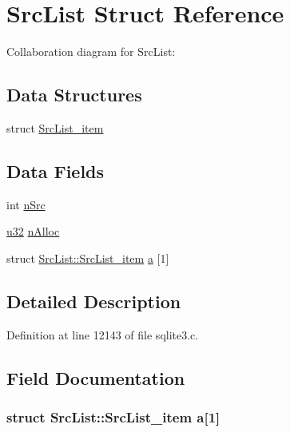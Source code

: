 \hypertarget{struct_src_list}{}\section{Src\+List Struct Reference}
\label{struct_src_list}


Collaboration diagram for Src\+List\+:
\subsection*{Data Structures}
\begin{DoxyCompactItemize}
\item 
struct \hyperlink{struct_src_list_1_1_src_list__item}{Src\+List\+\_\+item}
\end{DoxyCompactItemize}
\subsection*{Data Fields}
\begin{DoxyCompactItemize}
\item 
int \hyperlink{struct_src_list_a2cf806e5639f0b29b62fb34e3e822248}{n\+Src}
\item 
\hyperlink{sqlite3_8c_a03ad5adfaeb9b7640dde78a0cc390319}{u32} \hyperlink{struct_src_list_ab29b3b053096207217eb8b705a8b4816}{n\+Alloc}
\item 
struct \hyperlink{struct_src_list_1_1_src_list__item}{Src\+List\+::\+Src\+List\+\_\+item} \hyperlink{struct_src_list_a2dbc3f35656813aa1d620ed7933b1800}{a} \mbox{[}1\mbox{]}
\end{DoxyCompactItemize}


\subsection{Detailed Description}


Definition at line 12143 of file sqlite3.\+c.



\subsection{Field Documentation}
\hypertarget{struct_src_list_a2dbc3f35656813aa1d620ed7933b1800}{}
\subsubsection[{a}]{\setlength{\rightskip}{0pt plus 5cm}struct {\bf Src\+List\+::\+Src\+List\+\_\+item}  a\mbox{[}1\mbox{]}}\label{struct_src_list_a2dbc3f35656813aa1d620ed7933b1800}
\hypertarget{struct_src_list_ab29b3b053096207217eb8b705a8b4816}{}
